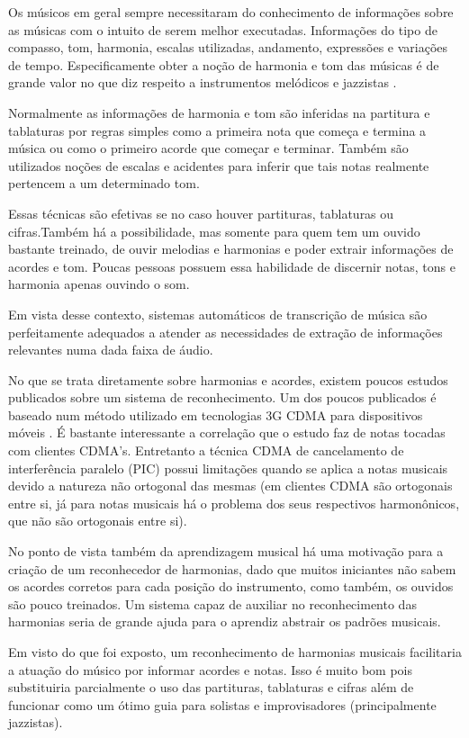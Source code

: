 Os músicos em geral sempre necessitaram do conhecimento de informações sobre as músicas com o intuito de serem melhor executadas. Informações do tipo de compasso, tom, harmonia, escalas utilizadas, andamento, expressões e variações de tempo. Especificamente obter a noção de harmonia e tom das músicas é de grande valor no que diz respeito a instrumentos melódicos e jazzistas \cite{jazzistas}.

Normalmente as informações de harmonia e tom são inferidas na partitura e tablaturas por regras simples como a primeira nota que começa e termina a música ou como o primeiro acorde que começar e terminar. Também são utilizados noções de escalas e acidentes para inferir que tais notas realmente pertencem a um determinado tom.

Essas técnicas são efetivas se no caso houver partituras, tablaturas ou cifras.Também há a possibilidade, mas somente para quem tem um ouvido bastante treinado, de ouvir melodias e harmonias e poder extrair informações de acordes e tom. Poucas pessoas possuem essa habilidade de discernir notas, tons e harmonia apenas ouvindo o som.

Em vista desse contexto, sistemas automáticos de transcrição de música \cite{automaticmusic} são perfeitamente adequados a atender as necessidades de extração de informações relevantes numa dada faixa de áudio.

No que se trata diretamente sobre harmonias e acordes, existem poucos estudos publicados sobre um sistema de reconhecimento. Um dos poucos publicados é baseado num método utilizado em tecnologias 3G CDMA para dispositivos móveis \cite{picchords}. É bastante interessante a correlação que o estudo faz de notas tocadas com clientes CDMA's. Entretanto a técnica CDMA de cancelamento de interferência paralelo (PIC) possui limitações quando se aplica a notas musicais devido a natureza não ortogonal das mesmas (em clientes CDMA são ortogonais entre si, já para notas musicais há o problema dos seus respectivos harmonônicos, que não são ortogonais entre si).

No ponto de vista também da aprendizagem musical há uma motivação para a criação de um reconhecedor de harmonias, dado que muitos iniciantes não sabem os acordes corretos para cada posição do instrumento, como também, os ouvidos são pouco treinados. Um sistema capaz de auxiliar no reconhecimento das harmonias seria de grande ajuda para o aprendiz abstrair os padrões musicais.

Em visto do que foi exposto, um reconhecimento de harmonias musicais facilitaria a atuação do músico por informar acordes e notas. Isso é muito bom pois substituiria parcialmente o uso das partituras, tablaturas e cifras além de funcionar como um ótimo guia para solistas e improvisadores (principalmente jazzistas).

